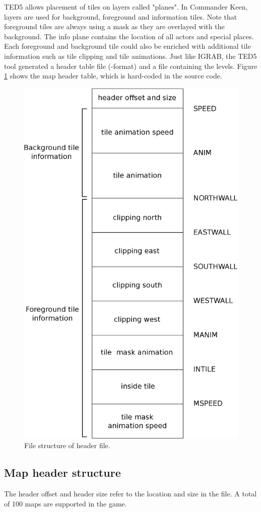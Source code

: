 \documentclass[book.tex]{subfiles}
\begin{document}
 \par
 TED5 allows placement of tiles on layers called "planes". In Commander Keen, layers are used for background, foreground and information tiles. Note that foreground tiles are always using a mask as they are overlayed with the background. The info plane contains the location of all actors and special places. Each foreground and background tile could also be enriched with additional tile information such as tile clipping and tile animations. Just like IGRAB, the TED5 tool generated a header table file (-format) and a  file containing the levels. Figure \ref{fig:map-header-file} shows the map header table, which is hard-coded in the source code.
\begin{figure}[H]
\centering
 \includegraphics[width=.7\textwidth]{imgs/drawings/map_header.eps}
 \caption{File structure of  header file.}
 \label{fig:map-header-file}
\end{figure}

\subsection{Map header structure}
The header offset and header size refer to the location and size in the  file. A total of 100 maps are supported in the game.\\
\par
\begin{minipage}{\textwidth}
 \par
 \end{minipage}
\end{document}
